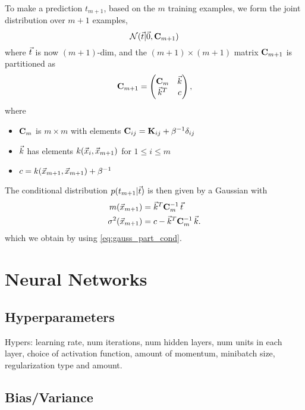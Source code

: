 \documentclass[11pt]{article}
\begin{document}
To make a prediction $t_{m+1}$, based on the $m$ training examples, we form the joint
distribution over $m+1$ examples,
\begin{equation}
  \mathcal{N}(\vec{t} | \vec{0}, \mathbf{C}_{m+1})
\end{equation}
where $\vec{t}$ is now $(m+1)$-dim, and the $(m+1) \times (m+1)$ matrix
$\mathbf{C}_{m+1}$ is partitioned as
\begin{equation}
  \mathbf{C}_{m+1} = 
  \left(
    \begin{matrix}
      \mathbf{C}_m & \vec{k}\\
      \vec{k}^T   & c
    \end{matrix}
  \right),
\end{equation}
where
\begin{itemize}
  \item $\mathbf{C}_m$ is $m \times m$ with elements
  $\mathbf{C}_{ij} = \mathbf{K}_{ij} + \beta^{-1} \delta_{ij}$
  \item $\vec{k}$ has elements $k(\vec{x}_i, \vec{x}_{m+1})$ for $1 \leq i \leq m$
  \item $c = k(\vec{x}_{m+1}, \vec{x}_{m+1}) + \beta^{-1}$
\end{itemize}

The conditional distribution $p(t_{m+1} | \vec{t})$ is then given by a Gaussian with
\begin{align}
  m(\vec{x}_{m+1})         &= \vec{k}^T \mathbf{C}_m^{-1}\, \vec{t}\\
  \sigma^2 (\vec{x}_{m+1}) &= c - \vec{k}^T \mathbf{C}_m^{-1}\, \vec{k}.
\end{align}
which we obtain by using \ref{eq:gauss_part_cond}.




\section{Neural Networks}
\label{sec:nn}

\subsection{Hyperparameters}
Hypers: learning rate, num iterations, num hidden layers, num units in each layer,
choice of activation function, amount of momentum, minibatch size, regularization type
and amount.

\subsection{Bias/Variance}
\end{document}
